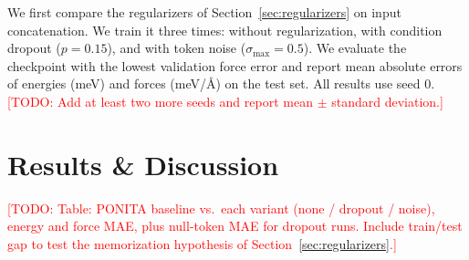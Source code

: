 \documentclass{article}
\newcommand{\todo}[1]{\textcolor{red}{[TODO: #1]}}
\begin{document}
We first compare the regularizers of Section~\ref{sec:regularizers} on input concatenation. We train it three times: without regularization, with condition dropout ($p=0.15$), and with token noise ($\sigma_{\max}=0.5$). We evaluate the checkpoint with the lowest validation force error and report mean absolute errors of energies (meV) and forces (meV/\AA) on the test set. All results use seed 0. \todo{Add at least two more seeds and report mean $\pm$ standard deviation.}

\section{Results \& Discussion}
\todo{Table: PONITA baseline vs.\ each variant (none / dropout / noise), energy and force MAE, plus null-token MAE for dropout runs. Include train/test gap to test the memorization hypothesis of Section~\ref{sec:regularizers}.}



\end{document}

